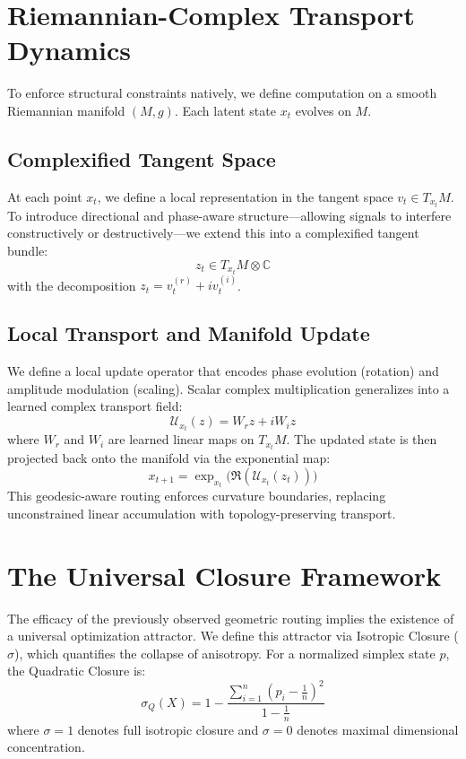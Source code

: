 \documentclass[11pt,twoside,a4paper]{article}
\begin{document}
\section{Riemannian-Complex Transport Dynamics}
To enforce structural constraints natively, we define computation on a smooth Riemannian manifold $(M, g)$. Each latent state $x_t$ evolves on $M$. 

\subsection{Complexified Tangent Space}
At each point $x_t$, we define a local representation in the tangent space $v_t \in T_{x_t}M$. To introduce directional and phase-aware structure—allowing signals to interfere constructively or destructively—we extend this into a complexified tangent bundle:
\begin{equation}
z_t \in T_{x_t}M \otimes \mathbb{C}
\end{equation}
with the decomposition $z_t = v_t^{(r)} + i v_t^{(i)}$.

\subsection{Local Transport and Manifold Update}
We define a local update operator that encodes phase evolution (rotation) and amplitude modulation (scaling). Scalar complex multiplication generalizes into a learned complex transport field:
\begin{equation}
\mathcal{U}_{x_t}(z) = W_r z + i W_i z
\end{equation}
where $W_r$ and $W_i$ are learned linear maps on $T_{x_t}M$. The updated state is then projected back onto the manifold via the exponential map:
\begin{equation}
x_{t+1} = \exp_{x_t}\big(\Re(\mathcal{U}_{x_t}(z_t))\big)
\end{equation}
This geodesic-aware routing enforces curvature boundaries, replacing unconstrained linear accumulation with topology-preserving transport.

\section{The Universal Closure Framework}
The efficacy of the previously observed geometric routing implies the existence of a universal optimization attractor. We define this attractor via Isotropic Closure ($\sigma$), which quantifies the collapse of anisotropy. For a normalized simplex state $p$, the Quadratic Closure is:
\begin{equation}
\sigma_Q(X) = 1 - \frac{\sum_{i=1}^n\left(p_i - \frac{1}{n}\right)^2}{1 - \frac{1}{n}}
\end{equation}
where $\sigma = 1$ denotes full isotropic closure and $\sigma = 0$ denotes maximal dimensional concentration.
\end{document}
